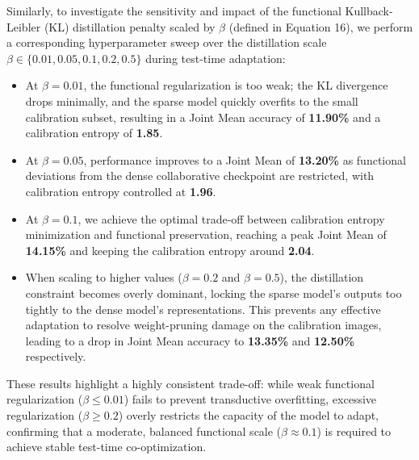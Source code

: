 Similarly, to investigate the sensitivity and impact of the functional Kullback-Leibler (KL) distillation penalty scaled by $\beta$ (defined in Equation 16), we perform a corresponding hyperparameter sweep over the distillation scale $\beta \in \{0.01, 0.05, 0.1, 0.2, 0.5\}$ during test-time adaptation:
\begin{itemize}[leftmargin=*]
    \item At $\beta = 0.01$, the functional regularization is too weak; the KL divergence drops minimally, and the sparse model quickly overfits to the small calibration subset, resulting in a Joint Mean accuracy of \textbf{11.90\%} and a calibration entropy of \textbf{1.85}.
    \item At $\beta = 0.05$, performance improves to a Joint Mean of \textbf{13.20\%} as functional deviations from the dense collaborative checkpoint are restricted, with calibration entropy controlled at \textbf{1.96}.
    \item At $\beta = 0.1$, we achieve the optimal trade-off between calibration entropy minimization and functional preservation, reaching a peak Joint Mean of \textbf{14.15\%} and keeping the calibration entropy around \textbf{2.04}.
    \item When scaling to higher values ($\beta = 0.2$ and $\beta = 0.5$), the distillation constraint becomes overly dominant, locking the sparse model's outputs too tightly to the dense model's representations. This prevents any effective adaptation to resolve weight-pruning damage on the calibration images, leading to a drop in Joint Mean accuracy to \textbf{13.35\%} and \textbf{12.50\%} respectively.
\end{itemize}
These results highlight a highly consistent trade-off: while weak functional regularization ($\beta \le 0.01$) fails to prevent transductive overfitting, excessive regularization ($\beta \ge 0.2$) overly restricts the capacity of the model to adapt, confirming that a moderate, balanced functional scale ($\beta \approx 0.1$) is required to achieve stable test-time co-optimization.

